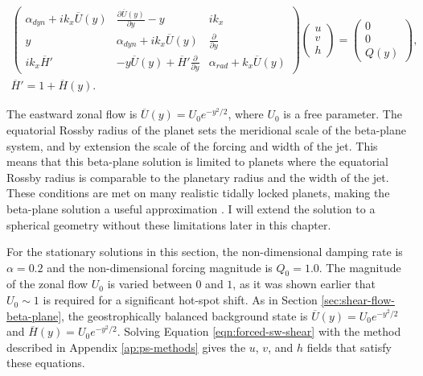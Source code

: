 \begin{equation}\label{eqn:forced-sw-shear}
  \begin{gathered}
    \begin{pmatrix}
    \alpha_{dyn} + i k_{x}\overline{U}(y) & \frac{\partial\overline{U}(y)}{\partial y}-y & i k_{x} \\
    y & \alpha_{dyn} + i k_{x}\overline{U}(y) & \frac{\partial}{\partial y} \\
    i k_{x}\overline{H}' & -y \overline{U}(y) + \overline{H}' \frac{\partial}{\partial y} & \alpha_{rad} + k_{x}\overline{U}(y)
    \end{pmatrix}
    \begin{pmatrix}
    u \\
    v \\
    h
    \end{pmatrix}
    =
    \begin{pmatrix}
    0 \\
    0 \\
    Q(y)
    \end{pmatrix}, \\
      \overline{H}' = 1+\overline{H}(y).
  \end{gathered}
\end{equation}

 The eastward zonal flow is $\overline{U}(y) = U_{0} e^{-y^{2}/2}$, where $U_{0}$ is a free parameter. The equatorial Rossby radius of the planet sets the meridional scale of the beta-plane system, and by extension the scale of the forcing and width of the jet. This means that this beta-plane solution is limited to planets where the equatorial Rossby radius is comparable to the planetary radius and the width of the jet. These conditions are met on many realistic tidally locked planets, making the beta-plane solution a useful approximation \citep{pierrehumbert2018review}. I will extend the solution to a spherical geometry without these limitations later in this chapter.

For the stationary solutions in this section, the non-dimensional damping rate is $\alpha = 0.2$ \citep{matsuno1966quasi} and the non-dimensional forcing magnitude is $Q_{0} = 1.0$. The magnitude of the zonal flow $U_{0}$ is varied between $0$ and $1$, as it was shown earlier that $U_{0} \sim 1$ is required for a significant hot-spot shift. As in Section \ref{sec:shear-flow-beta-plane}, the geostrophically balanced background state is $\overline{U}(y) =  U_{0} e^{-y^{2}/2}$ and $\overline{H}(y) =  U_{0} e^{-y^{2}/2}$. Solving Equation \ref{eqn:forced-sw-shear} with the method described in Appendix \ref{ap:ps-methods} gives the $u$, $v$, and $h$ fields that satisfy these equations.

